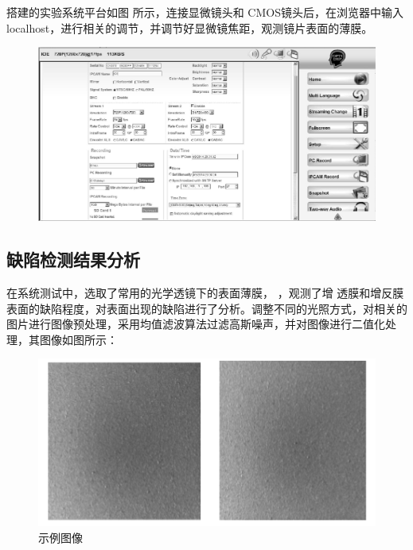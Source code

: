 搭建的实验系统平台如图 所示，连接显微镜头和 CMOS镜头后，在浏览器中输入localhost，进行相关的调节，并调节好显微镜焦距，观测镜片表面的薄膜。

\begin{figure}[h]
\centering
\includegraphics[width=0.7\linewidth]{Figure/rasp_fake_django}
\caption{}
\label{fig:rasp_fake_django}
\end{figure}


\subsection{缺陷检测结果分析}

在系统测试中，选取了常用的光学透镜下的表面薄膜， ，观测了增 透膜和增反膜表面的缺陷程度，对表面出现的缺陷进行了分析。调整不同的光照方式，对相关的图片进行图像预处理，采用均值滤波算法过滤高斯噪声，并对图像进行二值化处理，其图像如图所示：
\begin{figure}[h]
\centering
\includegraphics[width=0.7\linewidth]{Figure/ex_1}
\caption{示例图像}
\label{fig:ex_1}
\end{figure}

